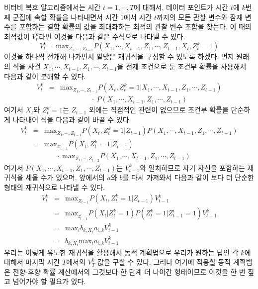 \documentclass[a4paper]{oblivoir}
\begin{document}
비터비 복호 알고리즘에서는 시간 $t=1,\cdots,T$에 대해서, 데이터 포인트가 시간 $t$에 $k$번째 군집에 속할 확률을 나타내면서 시간 $1$에서 시간 $t$까지의 모든 관찰 변수와 잠재 변수를 포함하는 결합 확률의 값을 최대화하는 최적의 관찰 변수 조합을 찾는다. 이 때의 최적값이 $V_{t}^{k}$라면 이것을 다음과 같은 수식으로 나타낼 수 있다. 
\begin{equation}
V_{t}^{k} = \textrm{max}_{Z_{1},\cdots,Z_{t-1}} P(X_1,\cdots,X_{t-1}, Z_1,\cdots,Z_{t-1}, X_{t}, Z_{t}^{k}=1)
\label{eq:9-25}
\end{equation}
이것을 하나씩 전개해 나가면서 알맞은 재귀식을 구성할 수 있도록 하겠다. 먼저 원래의 식을 사건 $X_1,\cdots,X_{t-1}, Z_1,\cdots,Z_{t-1}$을 전제 조건으로 둔 조건부 확률을 사용해서 다음과 같이 분해할 수 있다. 
\begin{eqnarray}
V_{t}^{k} & = & \textrm{max}_{Z_{1},\cdots,Z_{t-1}} P(X_{t}, Z_{t}^{k}=1 | X_1,\cdots,X_{t-1}, Z_1,\cdots,Z_{t-1})  \nonumber \\
&  & \ \ \ \ \ \ \ \ \ \ \ \ \ \ \ \ \ \ \ \ \cdot \ P(X_1,\cdots,X_{t-1}, Z_1,\cdots,Z_{t-1}) \label{eq:9-26} 
\end{eqnarray}
여기서 $X_{t}$와 $Z_{t}^{k}=1$는 $Z_{t-1}$ 외에는 직접적인 관련이 없으므로 조건부 확률을 단순하게 나타내어 식을 다음과 같이 바꿀 수 있다.  
\begin{eqnarray}
V_{t}^{k} & = & \textrm{max}_{Z_{1},\cdots,Z_{t-1}} P(X_{t}, Z_{t}^{k}=1 | Z_{t-1}) P(X_1,\cdots,X_{t-1}, Z_1,\cdots,Z_{t-1}) \nonumber \\
& = & \textrm{max}_{Z_{t-1}} P(X_{t}, Z_{t}^{k}=1 | Z_{t-1}) \nonumber \\ 
&  & \ \ \ \ \ \ \ \ \cdot \ \textrm{max}_{Z_{1},\cdots,Z_{t-2}} P(X_1,\cdots,X_{t-1}, Z_1,\cdots,Z_{t-1}) \label{eq:9-27}
\end{eqnarray}
여기서 $P(X_1,\cdots,X_{t-1}, Z_1,\cdots,Z_{t-1})$는 $V_{t-1}^{k}$와  일치하므로 자기 자신을 포함하는 재귀식을 세울 수가 있으며, 앞에서의 $a$와 $b$를 다시 가져와서 다음과 같이 보다 더 단순한 형태의 재귀식으로 나타낼 수 있다.
\begin{eqnarray}
V_{t}^{k} & = & \textrm{max}_{Z_{t-1}} P(X_{t}, Z_{t}^{k}=1 | Z_{t-1}) V_{t-1}^{k} \nonumber \\
& = & \textrm{max}_{z_{t-1}^{i}} P(X_{t} | Z_{t}^{k}=1) P(Z_{t}^{k} = 1 | Z_{t-1}^{i} = 1) V_{t-1}^{k}  \nonumber \\ 
& = & \textrm{max}_{i} b_{k,X_{t}} a_{i,k} V_{t-1}^{k} \nonumber \\ 
& = & b_{k,X_{t}} \textrm{max}_{i} a_{i,k} V_{t-1}^{k} \label{eq:9-28}
\end{eqnarray}
우리는 이렇게 유도한 재귀식을 활용해서 동적 계획법으로 우리가 원하는 답인 각 $k$에 대해서 마지막 시간 $T$에서의 $V_{T}^{k}$ 값을 구할 수 있다. 그러나 여기에 적용할 동적 계획법은 전향-후향 확률 계산에서의 그것보다 한 단계 더 나아간 형태이므로 이것을 한 번 짚고 넘어가야 할 필요가 있다. \\
\end{document}
